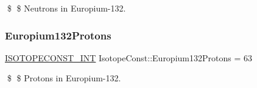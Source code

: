 \$ \$ Neutrons in Europium-\/132. \mbox{\label{group___isotope_const-_europium-_eu132_ga1b7dcce6c2e5f40c8bdf85cacd0c6042}} 
\subsubsection{\texorpdfstring{Europium132\+Protons}{Europium132Protons}}
{\footnotesize\ttfamily \mbox{\hyperlink{group___isotope_const-_macros_ga5f18360b3e99483a35c32d789e62621c}{I\+S\+O\+T\+O\+P\+E\+C\+O\+N\+S\+T\+\_\+\+I\+NT}} Isotope\+Const\+::\+Europium132\+Protons = 63}

\$ \$ Protons in Europium-\/132. 